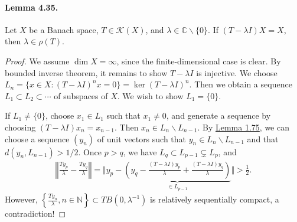 \documentclass{article}
\begin{document}
\paragraph{Lemma 4.35.\label{lemma:4.35}} Let $X$ be a Banach space, $T\in\mathcal{K}(X)$, and $\lambda\in\mathbb{C}\backslash\{0\}$. If $(T-\lambda I)X=X$, then $\lambda\in\rho(T)$.
\begin{proof}
We assume $\dim X=\infty$, since the finite-dimensional case is clear. By bounded inverse theorem, it remains to show $T-\lambda I$ is injective. We choose $L_n=\{x\in X:(T-\lambda I)^n x=0\} = \ker(T-\lambda I)^n$. Then we obtain a sequence $L_1\subset L_2\subset\cdots$ of subspaces of $X$. We wish to show $L_1=\{0\}$.

If $L_1\neq\{0\}$, choose $x_1\in L_1$ such that $x_1\neq 0$, and generate a sequence by choosing $(T-\lambda I)x_n=x_{n-1}$. Then $x_n\in L_n\backslash L_{n-1}$. By \hyperref[lemma:1.75]{Lemma 1.75}, we can choose a sequence $(y_n)$ of unit vectors such that $y_n\in L_n\backslash L_{n-1}$ and that $d(y_n,L_{n-1})>1/2$. Once $p>q$, we have $L_q\subset L_{p-1}\subsetneq L_p$, and
\begin{align*}
	\left\Vert\frac{Ty_p}{\lambda}-\frac{Ty_q}{\lambda}\right\Vert = \biggl\Vert y_p - \underbrace{\left(y_q - \frac{(T-\lambda I)y_p}{\lambda} + \frac{(T-\lambda I)y_q}{\lambda}\right)}_{\in L_{p-1}}\biggr\Vert > \frac{1}{2}.
\end{align*}
However, $\left\{\frac{Ty_n}{\lambda},n\in\mathbb{N}\right\}\subset TB(0,\lambda^{-1})$ is relatively sequentially compact, a contradiction!
\end{proof}
\end{document}
